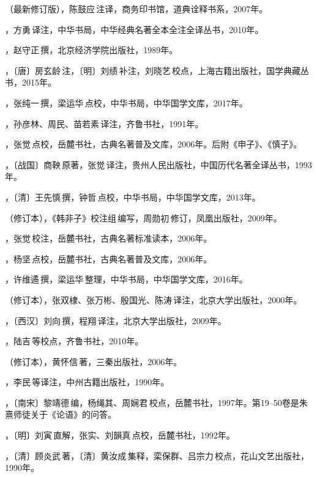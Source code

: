 （最新修订版），陈鼓应\,注译，商务印书馆，道典诠释书系，2007年。

，方勇\,译注，中华书局，中华经典名著全本全注全译丛书，2010年。

，赵守正\,撰，北京经济学院出版社，1989年。

，〔唐〕房玄龄\,注，〔明〕刘绩\,补注，刘晓艺\,校点，上海古籍出版社，国学典藏丛书，2015年。

，张纯一\,撰，梁运华\,点校，中华书局，中华国学文库，2017年。

，孙彦林、周民、苗若素\,译注，齐鲁书社，1991年。

，张觉\,点校，岳麓书社，古典名著普及文库，2006年。后附《申子》、《慎子》。

，〔战国〕商鞅\,原著，张觉\,译注，贵州人民出版社，中国历代名著全译丛书，1993年。

，〔清〕王先慎\,撰，钟哲\,点校，中华书局，中华国学文库，2013年。

（修订本），《韩非子》校注组\,编写，周勋初\,修订，凤凰出版社，2009年。

，张觉\,校注，岳麓书社，古典名著标准读本，2006年。

，杨坚\,点校，岳麓书社，古典名著普及文库，2006年。

，许维遹\,撰，梁运华\,整理，中华书局，中华国学文库，2016年。

（修订本），张双棣、张万彬、殷国光、陈涛\,译注，北京大学出版社，2000年。

，〔西汉〕刘向\,撰，程翔\,译注，北京大学出版社，2009年。

，陆吉\,等校点，齐鲁书社，2010年。

（修订本），黄怀信\,著，三秦出版社，2006年。

，李民\,等译注，中州古籍出版社，1990年。

，〔南宋〕黎靖德\,编，杨绳其、周娴君\,校点，岳麓书社，1997年。第19--50卷是朱熹师徒关于《论语》的问答。

，〔明〕刘寅\,直解，张实、刘韻真\,点校，岳麓书社，1992年。

，〔清〕顾炎武\,著，〔清〕黄汝成\,集释，栾保群、吕宗力\,校点，花山文艺出版社，1990年。

